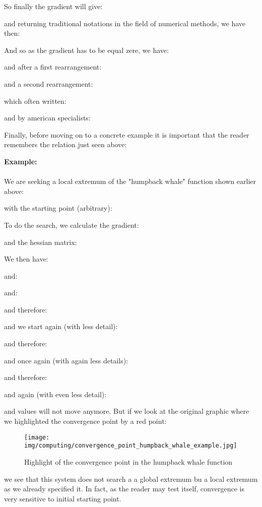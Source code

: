 	So finally the gradient will give:
	
	and returning traditional notations in the field of numerical methods, we have then:
	
	And so as the gradient has to be equal zere, we have:
	
	and after a first rearrangement:
	
	and a second rearrangement:
	
	which often written:
	
	and by american specialists:
	
	Finally, before moving on to a concrete example it is important that the reader remembers the relation just seen above:
	
	
	\pagebreak
	\begin{tcolorbox}[colframe=black,colback=white,sharp corners]
	\textbf{{\Large {}}Example:}\\\\
	We are seeking a local extremum of the "humpback whale" function shown earlier above:
	
	with the starting point (arbitrary):
	
	To do the search, we calculate the gradient:
	
	and the hessian matrix:
	
	We then have:
	
	and:
	
	and:
	
	and therefore:
	
	and we start again (with less detail):
	
	\end{tcolorbox}
	
	\pagebreak
	\begin{tcolorbox}[colframe=black,colback=white,sharp corners]
	
	and therefore:
	
	and once again (with again less details):
	
	and therefore:
	
	and again (with even less detail):
	
	and values will not move anymore. But if we look at the original graphic where we highlighted the convergence point by a red point:
	\begin{figure}[H]
		\centering
		\texttt{[image: img/computing/convergence\_point\_humpback\_whale\_example.jpg]}
		\caption[]{Highlight of the convergence point in the humpback whale function}
	\end{figure}
	we see that this system does not search a a global extremum bu a local extremum as we already specified it. In fact, as the reader may test itself, convergence is very sensitive to initial starting point.
	\end{tcolorbox}
	
